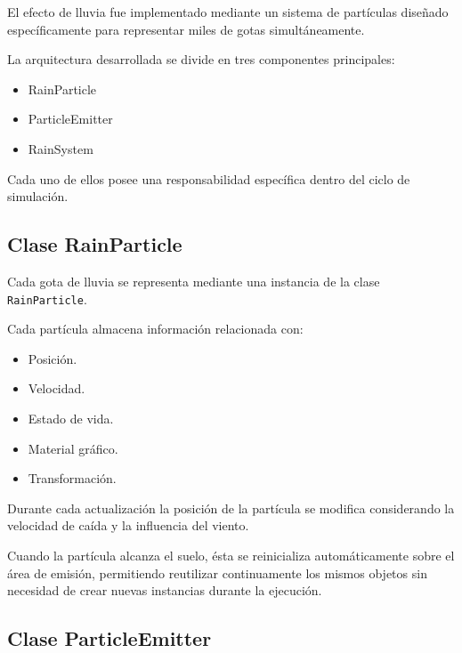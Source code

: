 El efecto de lluvia fue implementado mediante un sistema de partículas diseñado específicamente para representar miles de gotas simultáneamente.

La arquitectura desarrollada se divide en tres componentes principales:

\begin{itemize}

\item RainParticle

\item ParticleEmitter

\item RainSystem

\end{itemize}

Cada uno de ellos posee una responsabilidad específica dentro del ciclo de simulación.

\subsection{Clase RainParticle}

Cada gota de lluvia se representa mediante una instancia de la clase \texttt{RainParticle}.

Cada partícula almacena información relacionada con:

\begin{itemize}

\item Posición.

\item Velocidad.

\item Estado de vida.

\item Material gráfico.

\item Transformación.

\end{itemize}

Durante cada actualización la posición de la partícula se modifica considerando la velocidad de caída y la influencia del viento.

Cuando la partícula alcanza el suelo, ésta se reinicializa automáticamente sobre el área de emisión, permitiendo reutilizar continuamente los mismos objetos sin necesidad de crear nuevas instancias durante la ejecución.

\subsection{Clase ParticleEmitter}


